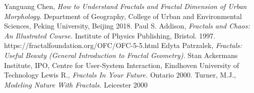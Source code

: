 \documentclass{article}
\begin{document}
\newpage
\tableofcontents
\listoftables
\listoffigures
\begin{thebibliography}{9}
 Yanguang Chen,
 \emph{How to Understand Fractals and Fractal Dimension
 of Urban Morphology}.
 Department of Geography, College of Urban and Environmental        Sciences, Peking University, Beijing
 2018.
 Paul S. Addison,
 \emph{Fractals and Chaos: An Illustrated Course.}
 Institute of Physics Publishing, Bristol.
 1997.
 https://fractalfoundation.org/OFC/OFC-5-5.html
 Edyta Patrzalek,
 \emph{Fractals: Useful Beauty
(General Introduction to Fractal Geometry)}.
 Stan Ackermans Institute,
 IPO, Centre for User-System Interaction, Eindhoven  University of Technology
 Lewis R.,
 \emph{Fractals In Your Future.}
  Ontario 2000.
 Turner, M.J.,
 \emph{Modeling Nature With Fractals.}
 Leicester 2000

\end{thebibliography}
\end{document}
